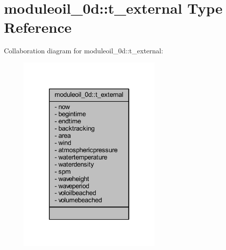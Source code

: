 \hypertarget{structmoduleoil__0d_1_1t__external}{}\section{moduleoil\+\_\+0d\+:\+:t\+\_\+external Type Reference}
\label{structmoduleoil__0d_1_1t__external}


Collaboration diagram for moduleoil\+\_\+0d\+:\+:t\+\_\+external\+:\nopagebreak
\begin{figure}[H]
\begin{center}
\leavevmode
\includegraphics[width=202pt]{structmoduleoil__0d_1_1t__external__coll__graph}
\end{center}
\end{figure}
